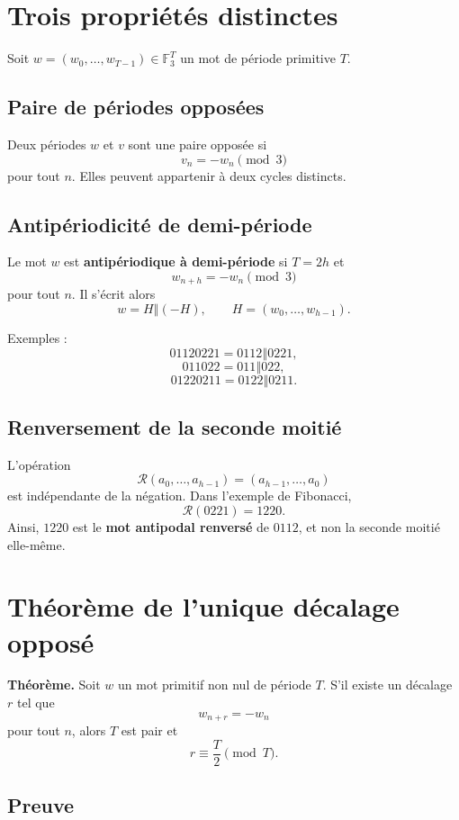 \documentclass[11pt,a4paper]{article}
\newcommand{\F}{\mathbb F}
\newcommand{\concat}{\mathbin{\Vert}}
\begin{document}
\section{Trois propriétés distinctes}

Soit \(w=(w_0,\ldots,w_{T-1})\in\F_3^T\) un mot de période primitive \(T\).

\subsection{Paire de périodes opposées}

Deux périodes \(w\) et \(v\) sont une paire opposée si
\[
v_n=-w_n\pmod 3
\]
pour tout \(n\). Elles peuvent appartenir à deux cycles distincts.

\subsection{Antipériodicité de demi-période}

Le mot \(w\) est \textbf{antipériodique à demi-période} si \(T=2h\) et
\[
w_{n+h}=-w_n\pmod 3
\]
pour tout \(n\). Il s'écrit alors
\[
w=H\concat(-H),
\qquad
H=(w_0,\ldots,w_{h-1}).
\]

Exemples :
\[
01120221=0112\concat0221,
\]
\[
011022=011\concat022,
\]
\[
01220211=0122\concat0211.
\]

\subsection{Renversement de la seconde moitié}

L'opération
\[
\mathcal R(a_0,\ldots,a_{h-1})=(a_{h-1},\ldots,a_0)
\]
est indépendante de la négation. Dans l'exemple de Fibonacci,
\[
\mathcal R(0221)=1220.
\]
Ainsi, \(1220\) est le \textbf{mot antipodal renversé} de \(0112\), et non
la seconde moitié elle-même.

\section{Théorème de l'unique décalage opposé}

\begin{summarybox}
\textbf{Théorème.} Soit \(w\) un mot primitif non nul de période \(T\).
S'il existe un décalage \(r\) tel que
\[
w_{n+r}=-w_n
\]
pour tout \(n\), alors \(T\) est pair et
\[
r\equiv \frac{T}{2}\pmod T.
\]
\end{summarybox}

\subsection*{Preuve}
\end{document}
